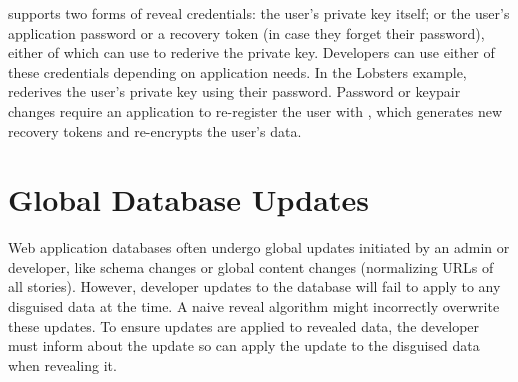 %
\sys supports two forms of reveal credentials: \one{} the user's private key
itself; or \two{} the user's application password or a recovery token (in case
they forget their password), either of which \sys can use to rederive the
private key.
%
Developers can use either of these credentials depending on application needs.
%
In the Lobsters example, \sys rederives the user's private key using their password.
%
%
%
Password or keypair changes require an application to re-register the user with
\sys, which generates new recovery tokens and re-encrypts the user's \xxed data.
%
%
%
%

%
%

\section{Global Database Updates} 
\label{s:overview:updates}

Web application databases often undergo global updates 
initiated by an admin or developer, like schema changes or global content
changes (\eg normalizing URLs of all stories). 
%
However, developer updates to the database will fail to apply to any disguised
data at the time. A naive reveal algorithm might incorrectly overwrite these
updates.
%
To ensure updates are applied to revealed data, the developer must inform \sys
about the update so \sys can apply the update to the disguised data when
revealing it.

